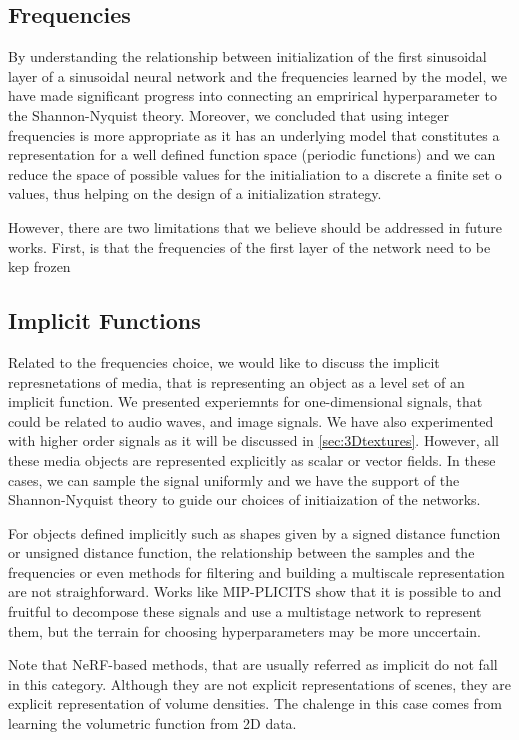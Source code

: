 \subsection{Frequencies}

By understanding the relationship between initialization of the first sinusoidal layer of a sinusoidal neural network and the frequencies learned by the model, we have made significant progress into connecting an emprirical hyperparameter to the Shannon-Nyquist theory. Moreover, we concluded that using integer frequencies is more appropriate as it has an underlying model that constitutes a representation for a well defined function space (periodic functions) and we can reduce the space of possible values for the initialiation to a discrete a finite set o values, thus helping on the design of a initialization strategy. 

However, there are two limitations that we believe should be addressed in future works. First, is that the frequencies of the first layer of the network need to be kep frozen 



\subsection{Implicit Functions}

Related to the frequencies choice, we would like to discuss the implicit represnetations of media, that is representing an object as a level set of an implicit function. We presented experiemnts for one-dimensional signals, that could be related to audio waves, and image signals. We have also experimented with higher order signals as it will be discussed in \ref{sec:3Dtextures}. However, all these media objects are represented explicitly as scalar or vector fields. In these cases, we can sample the signal uniformly and we have the support of the Shannon-Nyquist theory to guide our choices of initiaization of the networks.

For objects defined implicitly such as shapes given by a signed distance function or unsigned distance function, the relationship between the samples and the frequencies or even methods for filtering and building a multiscale representation are not straighforward. Works like MIP-PLICITS show that it is possible to and fruitful to decompose these signals and use a multistage network to represent them, but the terrain for choosing hyperparameters may be more unccertain.

Note that NeRF-based methods, that are usually referred as implicit do not fall in this category. Although they are not explicit representations of scenes, they are explicit representation of volume densities. The chalenge in this case comes from learning the volumetric function from 2D data.

